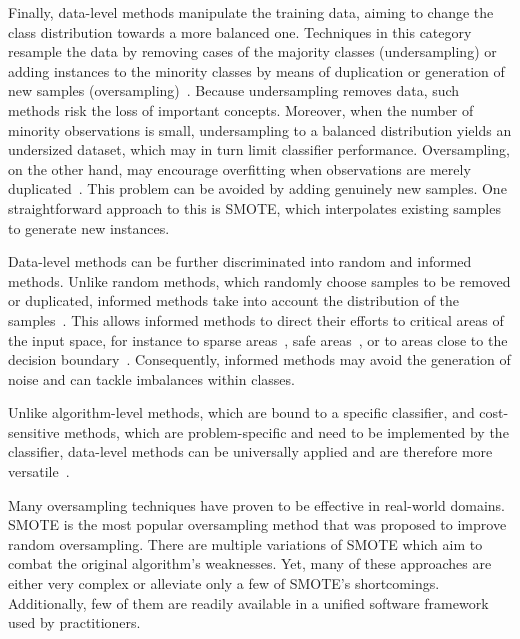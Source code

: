 \documentclass[sort&compress]{elsarticle}
\begin{document}
Finally, data-level methods manipulate the training data, aiming to change the class distribution towards a more balanced one. Techniques in this category resample the data by removing cases of the majority classes (undersampling) or adding instances to the minority classes by means of duplication or generation of new samples (oversampling)~\citep{Kotsiantis.2006,Galar.2012}. Because undersampling removes data, such methods risk the loss of important concepts. Moreover, when the number of minority observations is small, undersampling to a balanced distribution yields an undersized dataset, which may in turn limit classifier performance. Oversampling, on the other hand, may encourage overfitting when observations are merely duplicated~\citep{Weiss.2007}. This problem can be avoided by adding genuinely new samples. One straightforward approach to this is \ac{SMOTE}, which interpolates existing samples to generate new instances. 

Data-level methods can be further discriminated into random and informed methods. Unlike random methods, which randomly choose samples to be removed or duplicated, informed methods take into account the distribution of the samples~\citep{Chawla.2004}. This allows informed methods to direct their efforts to critical areas of the input space, for instance to sparse areas~\citep{Nickerson.2001}, safe areas~\citep{Bunkhumpornpat.2009}, or to areas close to the decision boundary~\citep{Han.2005}. Consequently, informed methods may avoid the generation of noise and can tackle imbalances within classes.

Unlike algorithm-level methods, which are bound to a specific classifier, and cost-sensitive methods, which are problem-specific and need to be implemented by the classifier, data-level methods can be universally applied and are therefore more versatile~\citep{Galar.2012}.

Many oversampling techniques have proven to be effective in real-world domains. \ac{SMOTE} is the most popular oversampling method that was proposed to improve random oversampling. There are multiple variations of \ac{SMOTE} which aim to combat the original algorithm's weaknesses. Yet, many of these approaches are either very complex or alleviate only a few of \ac{SMOTE}'s shortcomings. Additionally, few of them are readily available in a unified software framework used by practitioners.
\end{document}
